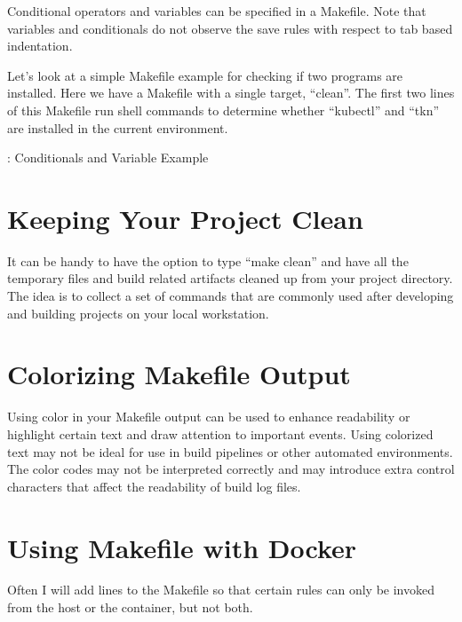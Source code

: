 \justifying
Conditional operators and variables can be specified in a Makefile. Note that variables and conditionals do not observe the save rules with respect to tab based indentation.

\justifying
Let's look at a simple Makefile example for checking if two programs are installed. Here we have a Makefile
with a single target, ``clean''. The first two lines of this Makefile run shell commands to determine
whether ``kubectl'' and ``tkn'' are installed in the current environment.

\begin{mybox}{\thetcbcounter: Conditionals and Variable Example}
	
\end{mybox}

\section{Keeping Your Project Clean}

\justifying
It can be handy to have the option to type ``make clean'' and have all the temporary files and build related artifacts cleaned up from your project directory. The idea is to collect a set of commands that are commonly used after developing and building projects on your local workstation.


\section{Colorizing Makefile Output}

\justifying
Using color in your Makefile output can be used to enhance readability or highlight certain text
and draw attention to important events. Using colorized text may not be ideal for use in build
pipelines or other automated environments. The color codes may not be interpreted correctly and may
introduce extra control characters that affect the readability of build log files.


\section{Using Makefile with Docker}

\justifying
Often I will add lines to the Makefile so that certain rules can only be invoked from the host or the container, but not both.

